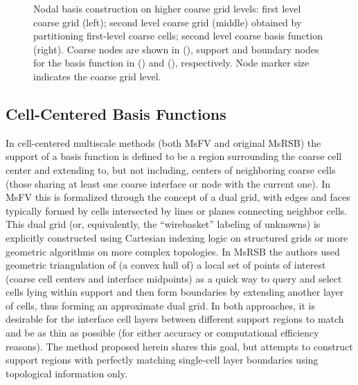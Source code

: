 \begin{figure}[htbp]
\begin{subfigure}[t]{0.3\textwidth}
  \end{subfigure}
  \caption[Higher level coarse grids and basis functions]{\label{fig:square_node_ml} Nodal basis construction on higher coarse grid levels: first level coarse grid (left); second level coarse grid (middle) obtained by partitioning first-level coarse cells; second level coarse basis function (right).   Coarse nodes are shown in (), support and boundary nodes for the basis function in () and (), respectively. Node marker size indicates the coarse grid level.}
\end{figure}

\subsection{Cell-Centered Basis Functions}
\label{subsec:msrsb_cell_basis}

In cell-centered multiscale methods (both MsFV and original MsRSB) the support of a basis function is defined to be a region surrounding the coarse cell center and extending to, but not including, centers of neighboring coarse cells (those sharing at least one coarse interface or node with the current one).   In MsFV this is formalized through the concept of a dual grid, with edges and faces typically formed by cells intersected by lines or planes connecting neighbor cells.   This dual grid (or, equivalently, the ``wirebasket'' labeling of unknowns) is explicitly constructed using Cartesian indexing logic on structured grids or more geometric algorithms on more complex topologies.   In MsRSB the authors used geometric triangulation of (a convex hull of) a local set of points of interest (coarse cell centers and interface midpoints) as a quick way to query and select cells lying within support and then form boundaries by extending another layer of cells, thus forming an approximate dual grid.   In both approaches, it is desirable for the interface cell layers between different support regions to match and be as thin as possible (for either accuracy or computational efficiency reasons).   The method proposed herein shares this goal, but attempts to construct support regions with perfectly matching single-cell layer boundaries using topological information only.

